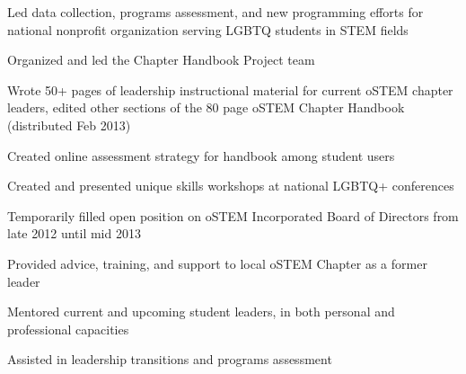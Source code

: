 \documentclass[letterpaper]{deedy-resume} %
\begin{document}
\begin{minipage}[t]{1\textwidth}
\begin{tightitemize}
\item Led data collection, programs assessment, and new programming efforts for national nonprofit organization serving LGBTQ students in STEM fields

\item Organized and led the Chapter Handbook Project team

\item Wrote 50+ pages of leadership instructional material for current oSTEM chapter leaders, edited other sections of the 80 page oSTEM Chapter Handbook (distributed Feb 2013)

\item Created online assessment strategy for handbook among student users

\item Created and presented unique skills workshops at national LGBTQ+ conferences

\item Temporarily filled open position on oSTEM Incorporated Board of Directors from late 2012 until mid 2013

\end{tightitemize}

\sectionspace %



\vspace{\topsep} %
\begin{tightitemize}

\item Provided advice, training, and support to local oSTEM Chapter as a former leader

\item Mentored current and upcoming student leaders, in both personal and professional capacities

\item Assisted in leadership transitions and programs assessment

\end{tightitemize}

\sectionspace %



\end{minipage}
\end{document}
